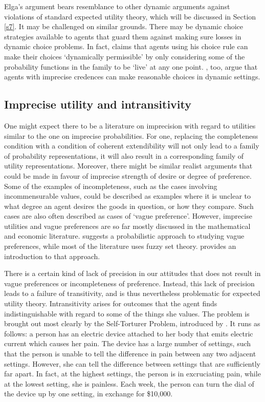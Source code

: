 Elga's argument bears resemblance to other dynamic arguments against violations of standard expected utility theory, which will be discussed in Section \ref{s7}. It may be challenged on similar grounds. There may be dynamic choice strategies available to agents that guard them against making sure losses in dynamic choice problems. In fact, \citet{Williams2014} claims that agents using his choice rule can make their choices `dynamically permissible' by only considering some of the probability functions in the family to be `live' at any one point. \citet{BradleySteele2014}, too, argue that agents with imprecise credences can make reasonable choices in dynamic settings.

\subsection{Imprecise utility and intransitivity}\label{subs43}

One might expect there to be a literature on imprecision with regard to utilities similar to the one on imprecise probabilities. For one, replacing the completeness condition with a condition of coherent extendibility will not only lead to a family of probability representations, it will also result in a corresponding family of utility representations. Moreover, there might be similar realist arguments that could be made in favour of imprecise strength of desire or degree of preference. Some of the examples of incompleteness, such as the cases involving incommensurable values, could be described as examples where it is unclear to what degree an agent desires the goods in question, or how they compare. Such cases are also often described as cases of `vague preference'. However, imprecise utilities and vague preferences are so far mostly discussed in the mathematical and economic literature. \citet{Fishburn1998} suggests a probabilistic approach to studying vague preferences, while most of the literature uses fuzzy set theory. \citet{Salles1998} provides an introduction to that approach.

There is a certain kind of lack of precision in our attitudes that does not result in vague preferences or incompleteness of preference. Instead, this lack of precision leads to a failure of transitivity, and is thus nevertheless problematic for expected utility theory. Intransitivity arises for outcomes that the agent finds indistinguishable with regard to some of the things she values. The problem is brought out most clearly by the Self-Torturer Problem, introduced by \citet{Quinn1990}. It runs as follows: a person has an electric device attached to her body that emits electric current which causes her pain. The device has a large number of settings, such that the person is unable to tell the difference in pain between any two adjacent settings. However, she can tell the difference between settings that are sufficiently far apart. In fact, at the highest settings, the person is in excruciating pain, while at the lowest setting, she is painless. Each week, the person can turn the dial of the device up by one setting, in exchange for \$10,000.

